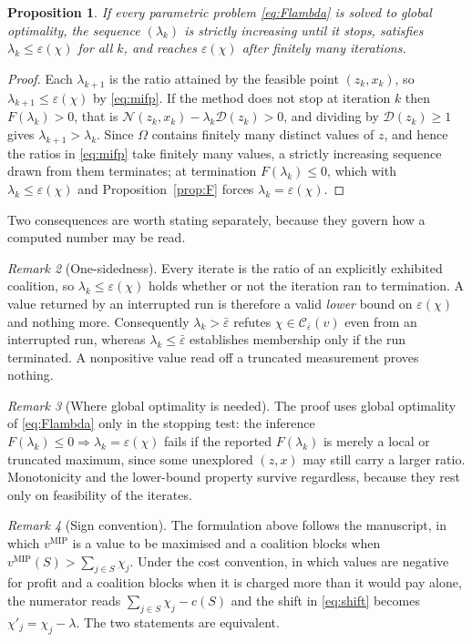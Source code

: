 \documentclass[11pt]{article}
\newcommand{\vmip}{v^{\mathrm{MIP}}}
\newcommand{\ssum}{\textstyle\sum}
\newtheorem{proposition}{Proposition}
\theoremstyle{remark}
\newtheorem{remark}[proposition]{Remark}
\begin{document}
\begin{proposition}
If every parametric problem \eqref{eq:Flambda} is solved to global optimality, the sequence
$(\lambda_k)$ is strictly increasing until it stops, satisfies $\lambda_k\le\varepsilon(\chi)$
for all $k$, and reaches $\varepsilon(\chi)$ after finitely many iterations.
\end{proposition}

\begin{proof}
Each $\lambda_{k+1}$ is the ratio attained by the feasible point $(z_k,x_k)$, so
$\lambda_{k+1}\le\varepsilon(\chi)$ by \eqref{eq:mifp}. If the method does not stop at
iteration $k$ then $F(\lambda_k)>0$, that is
$\mathcal{N}(z_k,x_k)-\lambda_k\mathcal{D}(z_k)>0$, and dividing by
$\mathcal{D}(z_k)\ge 1$ gives $\lambda_{k+1}>\lambda_k$. Since $\Omega$ contains finitely
many distinct values of $z$, and hence the ratios in \eqref{eq:mifp} take finitely many
values, a strictly increasing sequence drawn from them terminates; at termination
$F(\lambda_k)\le 0$, which with $\lambda_k\le\varepsilon(\chi)$ and
Proposition~\ref{prop:F} forces $\lambda_k=\varepsilon(\chi)$.
\end{proof}

Two consequences are worth stating separately, because they govern how a computed number
may be read.

\begin{remark}[One-sidedness]
Every iterate is the ratio of an explicitly exhibited coalition, so
$\lambda_k\le\varepsilon(\chi)$ holds whether or not the iteration ran to termination. A
value returned by an interrupted run is therefore a valid \emph{lower} bound on
$\varepsilon(\chi)$ and nothing more. Consequently $\lambda_k>\bar\varepsilon$ refutes
$\chi\in\mathcal{C}_{\bar\varepsilon}(v)$ even from an interrupted run, whereas
$\lambda_k\le\bar\varepsilon$ establishes membership only if the run terminated. A
nonpositive value read off a truncated measurement proves nothing.
\end{remark}

\begin{remark}[Where global optimality is needed]
The proof uses global optimality of \eqref{eq:Flambda} only in the stopping test: the
inference $F(\lambda_k)\le 0\Rightarrow\lambda_k=\varepsilon(\chi)$ fails if the reported
$F(\lambda_k)$ is merely a local or truncated maximum, since some unexplored
$(z,x)$ may still carry a larger ratio. Monotonicity and the lower-bound property survive
regardless, because they rest only on feasibility of the iterates.
\end{remark}

\begin{remark}[Sign convention]
The formulation above follows the manuscript, in which $\vmip$ is a value to be maximised
and a coalition blocks when $\vmip(S)>\ssum_{j\in S}\chi_j$. Under the cost convention, in
which values are negative for profit and a coalition blocks when it is charged more than it
would pay alone, the numerator reads $\ssum_{j\in S}\chi_j-c(S)$ and the shift in
\eqref{eq:shift} becomes $\chi'_j=\chi_j-\lambda$. The two statements are equivalent.
\end{remark}
\end{document}
